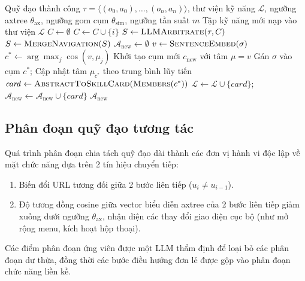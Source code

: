\begin{algorithm}[H]
  \caption{Phát hiện và trừu tượng hóa kỹ năng}
  \label{alg:discovery}
  \begin{algorithmic}[1]
    \Require Quỹ đạo thành công $\tau = \langle (o_0, a_0), \dots, (o_n, a_n) \rangle$, thư viện kỹ năng $\mathcal{L}$, ngưỡng axtree $\theta_{\mathrm{ax}}$, ngưỡng gom cụm $\theta_{\mathrm{sim}}$, ngưỡng tần suất $m$
    \Ensure Tập kỹ năng mới nạp vào thư viện $\mathcal{L}$
    \State $C \gets \emptyset$ 
    \State $C \gets C \cup \{i\}$
    \EndIf
    \EndFor
    \State $S \gets \textsc{LLMArbitrate}(\tau, C)$ 
    \State $S \gets \textsc{MergeNavigation}(S)$ 
    \State $\mathcal{A}_{\text{new}} \gets \emptyset$
    \State $v \gets \textsc{SentenceEmbed}(\sigma)$
    \State $c^* \gets \arg\max_j \cos(v, \mu_j)$ 
    \State Khởi tạo cụm mới $c_{\text{new}}$ với tâm $\mu = v$
    \Else
    \State Gán $\sigma$ vào cụm $c^*$; Cập nhật tâm $\mu_{c^*}$ theo trung bình lũy tiến
    \EndIf
    \State $\mathit{card} \gets \textsc{AbstractToSkillCard}(\textsc{Members}(c^*))$
    \State $\mathcal{L} \gets \mathcal{L} \cup \{\mathit{card}\}$; \quad $\mathcal{A}_{\text{new}} \gets \mathcal{A}_{\text{new}} \cup \{\mathit{card}\}$
    \EndIf
    \EndIf
    \EndFor
    \State \Return $\mathcal{A}_{\text{new}}$
  \end{algorithmic}
\end{algorithm}

\subsection{Phân đoạn quỹ đạo tương tác}

Quá trình phân đoạn chia tách quỹ đạo dài thành các đơn vị hành vi độc lập về mặt chức năng dựa trên 2 tín hiệu chuyển tiếp:
\begin{enumerate}
  \item Biến đổi URL tương đối giữa 2 bước liên tiếp ($u_i \neq u_{i-1}$).
  \item Độ tương đồng cosine giữa vector biểu diễn axtree của 2 bước liên tiếp giảm xuống dưới ngưỡng $\theta_{\mathrm{ax}}$, nhận diện các thay đổi giao diện cục bộ (như mở rộng menu, kích hoạt hộp thoại).
\end{enumerate}
Các điểm phân đoạn ứng viên được một LLM thẩm định để loại bỏ các phân đoạn dư thừa, đồng thời các bước điều hướng đơn lẻ được gộp vào phân đoạn chức năng liền kề.


